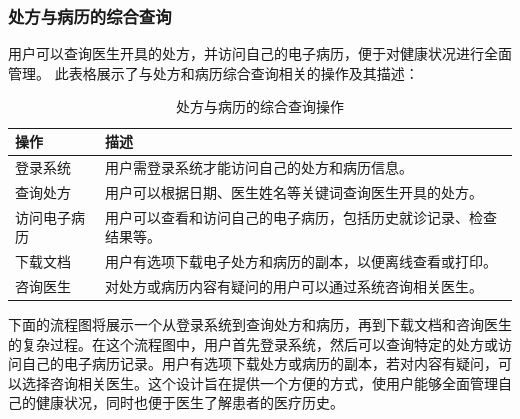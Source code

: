 \subsubsection{处方与病历的综合查询}
用户可以查询医生开具的处方，并访问自己的电子病历，便于对健康状况进行全面管理。
此表格展示了与处方和病历综合查询相关的操作及其描述：
\begin{table}[htbp]
	\centering
	\begin{tabular}{|p{6cm}|p{6cm}|}
		\hline
		\textbf{操作} & \textbf{描述} \\
		\hline
		登录系统 & 用户需登录系统才能访问自己的处方和病历信息。 \\
		查询处方 & 用户可以根据日期、医生姓名等关键词查询医生开具的处方。 \\
		访问电子病历 & 用户可以查看和访问自己的电子病历，包括历史就诊记录、检查结果等。 \\
		下载文档 & 用户有选项下载电子处方和病历的副本，以便离线查看或打印。 \\
		咨询医生 & 对处方或病历内容有疑问的用户可以通过系统咨询相关医生。 \\
		\hline
	\end{tabular}
	\caption{处方与病历的综合查询操作}
\end{table}
下面的流程图将展示一个从登录系统到查询处方和病历，再到下载文档和咨询医生的复杂过程。在这个流程图中，用户首先登录系统，然后可以查询特定的处方或访问自己的电子病历记录。用户有选项下载处方或病历的副本，若对内容有疑问，可以选择咨询相关医生。这个设计旨在提供一个方便的方式，使用户能够全面管理自己的健康状况，同时也便于医生了解患者的医疗历史。
